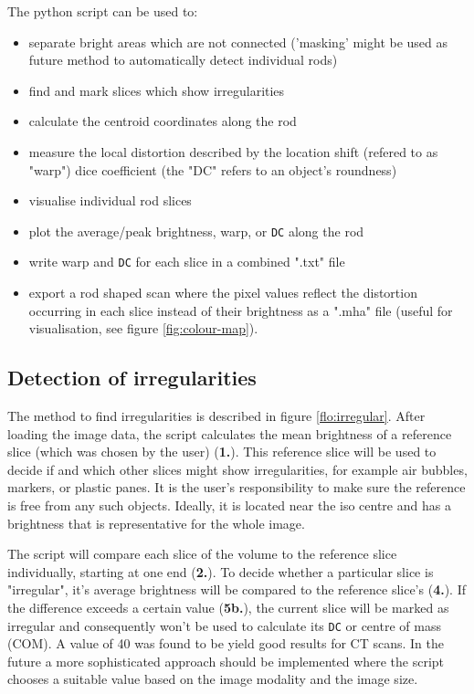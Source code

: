 The python script can be used to:
\begin{itemize}
 \item separate bright areas which are not connected ('masking' might be used as future method to automatically detect individual rods)
 \item find and mark slices which show irregularities
 \item calculate the centroid coordinates along the rod
 \item measure the local distortion described by the
  \subitem location shift (refered to as "warp")
  \subitem dice coefficient (the "DC" refers to an object's roundness)
 \item visualise individual rod slices
 \item plot the average/peak brightness, warp, or \texttt{DC} along the rod
 \item write warp and \texttt{DC}  for each slice in a combined ".txt" file
 \item export a rod shaped scan where the pixel values reflect the distortion occurring in each slice instead of their brightness as a ".mha" file (useful for visualisation, see figure \ref{fig:colour-map}).
\end{itemize}

\subsection{Detection of irregularities}

The method to find irregularities is described in figure \ref{flo:irregular}.
After loading the image data, the script calculates the mean brightness of a reference slice (which was chosen by the user) (\textbf{1.}).
This reference slice will be used to decide if and which other slices might show irregularities, for example air bubbles, markers, or plastic panes.
It is the user's responsibility to make sure the reference is free from any such objects.
Ideally, it is located near the iso centre and has a brightness that is representative for the whole image.

The script will compare each slice of the volume to the reference slice individually, starting at one end (\textbf{2.}).
To decide whether a particular slice is "irregular", it's average brightness will be compared to the reference slice's (\textbf{4.}).
If the difference exceeds a certain value (\textbf{5b.}), the current slice will be marked as irregular and consequently won't be used to calculate its \texttt{DC} or centre of mass (COM).
A value of 40 was found to be yield good results for CT scans.
In the future a more sophisticated approach should be implemented where the script chooses a suitable value based on the image modality and the image size.

